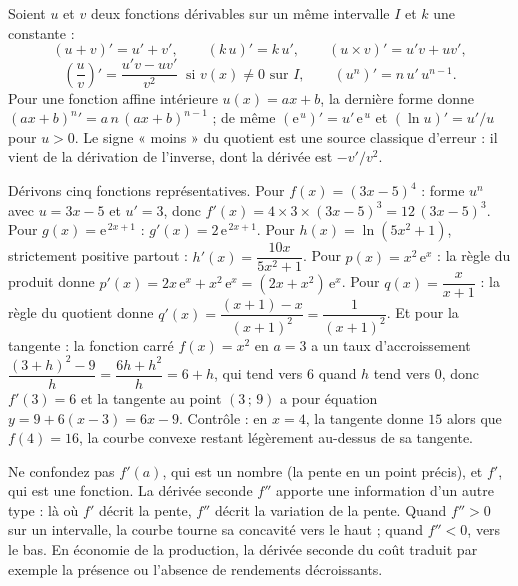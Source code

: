 \begin{propriete}
Soient $u$ et $v$ deux fonctions dérivables sur un même intervalle $I$ et $k$ une constante :
\[
(u + v)' = u' + v', \qquad (k\,u)' = k\,u', \qquad (u \times v)' = u'v + u v',
\]
\[
\left(\frac{u}{v}\right)' = \frac{u'v - u v'}{v^{2}} \ \text{ si } v(x) \neq 0 \text{ sur } I, \qquad (u^{n})' = n\,u'\,u^{n-1}.
\]
Pour une fonction affine intérieure $u(x) = ax + b$, la dernière forme donne $(ax+b)^{n}{}' = a\,n\,(ax+b)^{n-1}$ ; de même $(\mathrm{e}^{\,u})' = u'\,\mathrm{e}^{\,u}$ et $(\ln u)' = u'/u$ pour $u > 0$. Le signe « moins » du quotient est une source classique d'erreur : il vient de la dérivation de l'inverse, dont la dérivée est $-v'/v^{2}$.
\end{propriete}

\begin{exemple}
Dérivons cinq fonctions représentatives. Pour $f(x) = (3x-5)^{4}$ : forme $u^{n}$ avec $u = 3x-5$ et $u' = 3$, donc $f'(x) = 4 \times 3 \times (3x-5)^{3} = 12\,(3x-5)^{3}$. Pour $g(x) = \mathrm{e}^{\,2x+1}$ : $g'(x) = 2\,\mathrm{e}^{\,2x+1}$. Pour $h(x) = \ln(5x^{2}+1)$, strictement positive partout : $h'(x) = \dfrac{10x}{5x^{2}+1}$. Pour $p(x) = x^{2}\,\mathrm{e}^{x}$ : la règle du produit donne $p'(x) = 2x\,\mathrm{e}^{x} + x^{2}\,\mathrm{e}^{x} = (2x + x^{2})\,\mathrm{e}^{x}$. Pour $q(x) = \dfrac{x}{x+1}$ : la règle du quotient donne $q'(x) = \dfrac{(x+1) - x}{(x+1)^{2}} = \dfrac{1}{(x+1)^{2}}$. Et pour la tangente : la fonction carré $f(x) = x^{2}$ en $a = 3$ a un taux d'accroissement $\dfrac{(3+h)^{2} - 9}{h} = \dfrac{6h + h^{2}}{h} = 6 + h$, qui tend vers $6$ quand $h$ tend vers $0$, donc $f'(3) = 6$ et la tangente au point $(3\,;\,9)$ a pour équation $y = 9 + 6(x-3) = 6x - 9$. Contrôle : en $x = 4$, la tangente donne $15$ alors que $f(4) = 16$, la courbe convexe restant légèrement au-dessus de sa tangente.
\end{exemple}

\begin{remarque}
Ne confondez pas $f'(a)$, qui est un nombre (la pente en un point précis), et $f'$, qui est une fonction. La dérivée seconde $f''$ apporte une information d'un autre type : là où $f'$ décrit la pente, $f''$ décrit la variation de la pente. Quand $f'' > 0$ sur un intervalle, la courbe tourne sa concavité vers le haut ; quand $f'' < 0$, vers le bas. En économie de la production, la dérivée seconde du coût traduit par exemple la présence ou l'absence de rendements décroissants.
\end{remarque}

